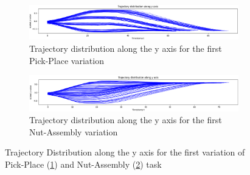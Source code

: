 \begin{figure}[hbt!]
    \centering
    \begin{subfigure}[b]{0.9\textwidth}
        \centering
        \includegraphics[width=\textwidth]{Figures/images/dataset_distribution/pick_place_variation_0_y.png}
        \caption{Trajectory distribution along the y axis for the first Pick-Place variation}
        \label{fig:pick_place_first_variation}
    \end{subfigure}
    \hfil
    \begin{subfigure}[b]{0.9\textwidth}
        \centering
        \includegraphics[width=\textwidth]{Figures/images/dataset_distribution/nut_assembly_variation_0_y.png}
        \caption{Trajectory distribution along the y axis for the first Nut-Assembly variation}
        \label{fig:nut_assembly_first_variation}
    \end{subfigure}
    \caption{Trajectory Distribution along the y axis for the first variation of Pick-Place (\ref{fig:pick_place_first_variation}) and Nut-Assembly (\ref{fig:nut_assembly_first_variation}) task}
    \label{fig:dataset_distribution}
\end{figure}
